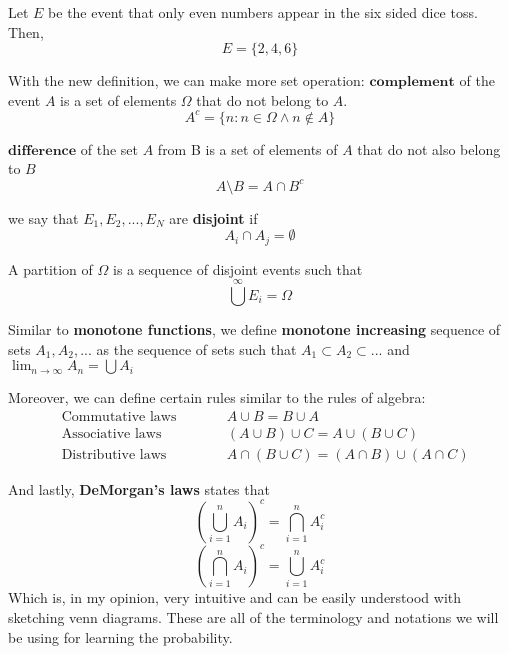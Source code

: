 \begin{example}
    Let $E$ be the event that only even numbers appear in the six sided dice toss. Then,
    $$E = \{2,4,6 \}$$
\end{example}
With the new definition, we can make more set operation: 
$\textbf{complement}$ of the event $A$ is a set of elements $\Omega$ that do not belong to $A$. 
$$A^{c} = \{n: n \in \Omega \land n \not\in A \}$$
\par
$\textbf{difference}$ of the set $A$ from B is a set of elements of $A$ that do not also belong to $B$
$$A \setminus B = A \cap B^c$$
\par we say that $E_1,E_2,...,E_N$ are \textbf{disjoint} if 
$$A_i \cap A_j =  \emptyset $$
\par
A partition of $\Omega$ is a sequence of disjoint events  such that $$\bigcup^{\infty} E_i = \Omega$$

\par 

Similar to \textbf{monotone functions}, we define \textbf{monotone increasing} sequence of sets $A_1,A_2,...$ as the sequence of sets such that $A_1 \subset A_2 \subset...$ and $\lim_{n \rightarrow \infty} A_n = \bigcup A_i$

\par

Moreover, we can define certain rules similar to the rules of algebra:
$$\begin{aligned}
    &\text{Commutative laws} \qquad  &&A \cup B = B \cup A \\
    &\text{Associative laws} \qquad  &&(A \cup B) \cup C = A \cup (B \cup C) \\
    &\text{Distributive laws} \qquad &&A \cap (B \cup C) = (A \cap B) \cup (A \cap C)
\end{aligned}$$

\par

And lastly, \textbf{DeMorgan's laws} states that
$$ \left( \bigcup_{i=1}^n A_i \right) ^c = \bigcap_{i=1}^n A_i^c $$
$$ \left( \bigcap_{i=1}^n A_i \right) ^c = \bigcup_{i=1}^n A_i^c $$
Which is, in my opinion, very intuitive and can be easily understood with sketching venn diagrams.
These are all of the terminology and notations we will be using for learning the probability.









